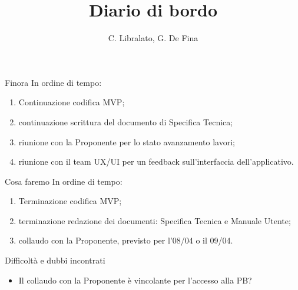 \documentclass{beamer}
\title{Diario di bordo}
\author[C. Libralato, G. De Fina]{C. Libralato, G. De Fina}
\begin{document}
{
\begin{frame}
    \titlepage
\end{frame}
}

\begin{frame}{Finora}
    In ordine di tempo:
    \begin{enumerate}
        \setlength{\itemsep}{0.9em}
        \item Continuazione codifica MVP;
        \item continuazione scrittura del documento di Specifica Tecnica;
        \item riunione con la Proponente per lo stato avanzamento lavori;
        \item riunione con il team UX/UI per un feedback sull'interfaccia dell'applicativo.
    \end{enumerate}
\end{frame}

\begin{frame}{Cosa faremo}
    In ordine di tempo:
    \begin{enumerate}
        \setlength{\itemsep}{1.2em}
        \item Terminazione codifica MVP;
        \item terminazione redazione dei documenti: Specifica Tecnica e Manuale Utente;
        \item collaudo con la Proponente, previsto per l'08/04 o il 09/04.
    \end{enumerate}
\end{frame}


 \begin{frame}{Difficoltà e dubbi incontrati}
     \begin{center}
         \begin{itemize}
             \item Il collaudo con la Proponente è vincolante per l'accesso alla PB?
         \end{itemize}
     \end{center}
 \end{frame}
\end{document}
